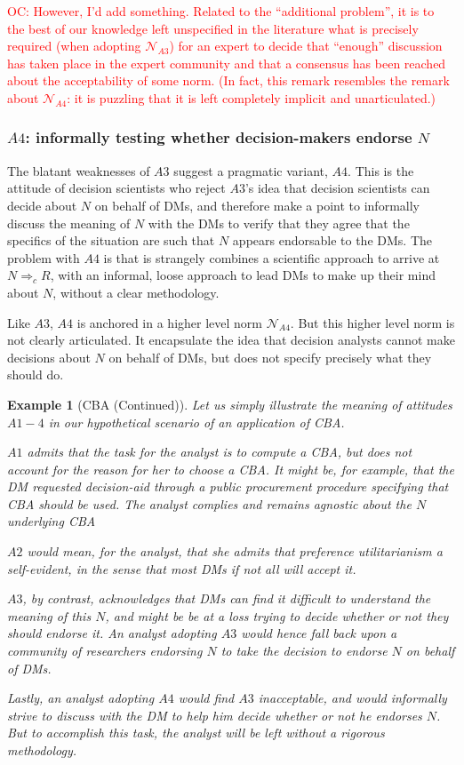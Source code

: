 \documentclass[preprint, french, english, 11pt, authoryear]{elsarticle}%
\newcommand{\protectforpdf}[1]{\texorpdfstring{\ensuremath{#1}}{#1}}
\newtheorem{example}{Example}
\newcommand{\commentOC}[1]{\textcolor{red}{OC: #1}}
\begin{document}
\commentOC{However, I’d add something. Related to the “additional problem”, it is to the best of our knowledge left unspecified in the literature what is precisely required (when adopting  $\mathscr{N}_{A3}$) for an expert to decide that “enough” discussion has taken place in the expert community and that a consensus has been reached about the acceptability of some norm. 
(In fact, this remark resembles the remark about $\mathscr{N}_{A4}$: it is puzzling that it is left completely implicit and unarticulated.) 
}

\subsubsection{\protectforpdf{A4}: informally testing whether decision-makers endorse \protectforpdf{N}}
The blatant weaknesses of $A3$ suggest a pragmatic variant, $A4$. This is the attitude of decision scientists who reject $A3$'s idea that decision scientists can decide about $N$ on behalf of \acp{DM}, and therefore make a point to informally discuss the meaning of $N$ with the \acp{DM} to verify that they agree that the specifics of the situation are such that $N$ appears endorsable to the \acp{DM}. The problem with $A4$ is that is strangely combines a scientific approach to arrive at $N ⇒_c R$, with an informal, loose approach to lead \acp{DM} to make up their mind about $N$, without a clear methodology.

Like $A3$, $A4$ is anchored in a higher level norm $\mathscr{N}_{A4}$. But this higher level norm is not clearly articulated. It encapsulate the idea that decision analysts cannot make decisions about $N$ on behalf of \acp{DM}, but does not specify precisely what they should do.

\begin{example}[CBA (Continued)]
Let us simply illustrate the meaning of attitudes $A1-4$ in our hypothetical scenario of an application of CBA.

$A1$ admits that the task for the analyst is to compute a CBA, but does not account for the reason for her to choose a CBA. It might be, for example, that the \ac{DM} requested decision-aid through a public procurement procedure specifying that CBA should be used. The analyst complies and remains agnostic about the $N$ underlying CBA

$A2$ would mean, for the analyst, that she admits that preference utilitarianism a self-evident, in the sense that most \acp{DM} if not all will accept it.

$A3$, by contrast, acknowledges that \acp{DM} can find it difficult to understand the meaning of this $N$, and might be be at a loss trying to decide whether or not they should endorse it. An analyst adopting $A3$ would hence fall back upon a community of researchers endorsing $N$ to take the decision to endorse $N$ on behalf of \acp{DM}.

Lastly, an analyst adopting $A4$ would find $A3$ inacceptable, and would informally strive to discuss with the \ac{DM} to help him decide whether or not he endorses $N$. But to accomplish this task, the analyst will be left without a rigorous methodology.
\end{example}
\end{document}
